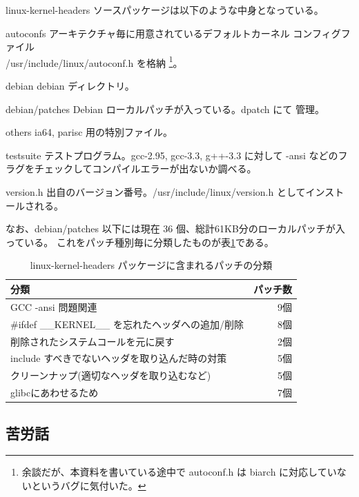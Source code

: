 \documentclass[mingoth,a4paper]{jsarticle}
\newenvironment{gdescription}%
{%
   \begin{list}{}%
   {%
      \setlength{\itemindent}{0mm}
      \setlength{\leftmargin}{45mm}%
      \setlength{\rightmargin}{0zw}%
      \setlength{\labelsep}{4mm}%
      \setlength{\labelwidth}{4cm}%
      \setlength{\itemsep}{0em}%
      \setlength{\parsep}{0cm}%
      \setlength{\listparindent}{0cm}%
      \let\makelabel\gdescriptionlabel
   }
}{%
   \end{list}%
}
\newcommand*\gdescriptionlabel[1]{\hspace\labelsep\normalfont\bfseries #1}
\begin{document}
  linux-kernel-headers ソースパッケージは以下のような中身となっている。

  \begin{gdescription}
    \item[autoconfs] アーキテクチャ毎に用意されているデフォルトカーネル
	       コンフィグファイル\\
	       /usr/include/linux/autoconf.h を格納
	       \footnote{余談だが、本資料を書いている途中で autoconf.h
	       は biarch に対応していないというバグに気付いた。}。
    \item[debian] debian ディレクトリ。
    \item[debian/patches] Debian ローカルパッチが入っている。dpatch にて
	       管理。
    \item[others] ia64, parisc 用の特別ファイル。
    \item[testsuite] テストプログラム。gcc-2.95, gcc-3.3, g++-3.3 に対して -ansi などのフラグをチェックしてコンパイルエラーが出ないか調べる。
    \item[version.h] 出自のバージョン番号。/usr/include/linux/version.h としてインストールされる。
  \end{gdescription}

  なお、debian/patches 以下には現在 36 個、総計61KB分のローカルパッチが入っている。
  これをパッチ種別毎に分類したものが表\ref{lkh-patches}である。

  \begin{table}[h]
    \begin{center}
      {
	\begin{tabular}{l|r} \hline
		分類						& パッチ数 \\ \hline \hline
		GCC -ansi 問題関連				& 9個	\\
		\#ifdef \_\_KERNEL\_\_ を忘れたヘッダへの追加/削除	& 8個	\\
		削除されたシステムコールを元に戻す		& 2個	\\
		include すべきでないヘッダを取り込んだ時の対策	& 5個	\\
		クリーンナップ(適切なヘッダを取り込むなど)	& 5個	\\
		glibcにあわせるため				& 7個	\\ \hline
	   \end{tabular}
	}
        \caption{linux-kernel-headers パッケージに含まれるパッチの分類}
        \label{lkh-patches}
        \end{center}
        \end{table}

\subsection{苦労話}
\end{document}
